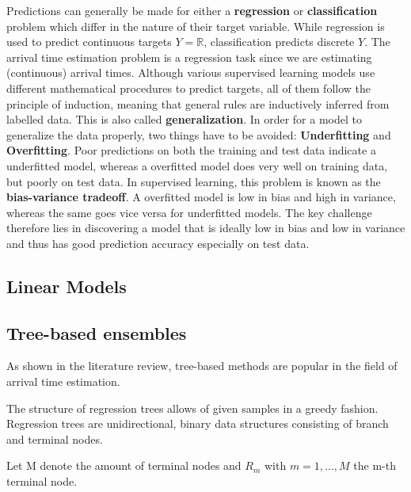 Predictions can generally be made for either a \textbf{regression} or \textbf{classification} problem which differ in the nature of their target variable. While regression is used to predict continuous targets $ Y = \mathbb{R} $, classification predicts discrete $ Y $. The arrival time estimation problem is a regression task since we are estimating (continuous) arrival times.
Although various supervised learning models use different mathematical procedures to predict targets, all of them follow the principle of induction, meaning that general rules are inductively inferred from labelled data. This is also called \textbf{generalization}.  
In order for a model to generalize the data properly, two things have to be avoided: \textbf{Underfitting} and \textbf{Overfitting}. Poor predictions on both the training and test data indicate a underfitted model, whereas a overfitted model does very well on training data, but poorly on test data. In supervised learning, this problem is known as the \textbf{bias-variance tradeoff}. A overfitted model is low in bias and high in variance, whereas the same goes vice versa for underfitted models. The key challenge therefore lies in discovering a model that is ideally low in bias and low in variance and thus has good prediction accuracy especially on test data. 

\subsection{Linear Models}

\subsection{Tree-based ensembles}

As shown in the literature review, tree-based methods are popular in the field of arrival time estimation. 

The structure of regression trees allows  of given samples in a greedy fashion. Regression trees are unidirectional, binary data structures consisting of branch and terminal nodes.

Let M denote the amount of terminal nodes and $ R_m $ with $ m = 1, ..., M $ the m-th terminal node. 








 











